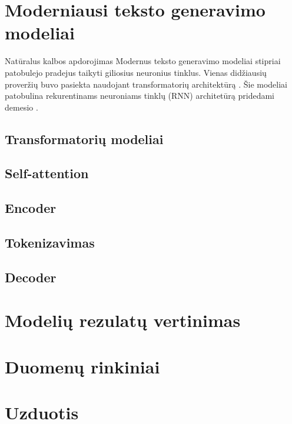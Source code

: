 \documentclass{VUMIFPSbakalaurinis}
\begin{document}
\section{Moderniausi teksto generavimo modeliai}

Natūralus kalbos apdorojimas
Modernus teksto generavimo modeliai stipriai patobulejo pradejus taikyti giliosius neuronius tinklus. 
Vienas didžiausių proveržių buvo pasiekta naudojant transformatorių architektūrą \cite{vaswani2017attention}.
Šie modeliai patobulina rekurentinams neuroniams tinklų (RNN) architetūrą pridedami demesio .


\subsection{Transformatorių modeliai}

\subsection{Self-attention}

\subsection{Encoder}

\subsection{Tokenizavimas}

\subsection{Decoder}

\section{Modelių rezulatų vertinimas}   

\section{Duomenų rinkiniai}



\section{Uzduotis}
\end{document}
